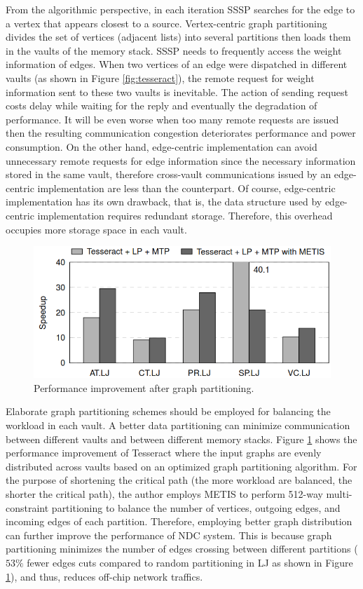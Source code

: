 \documentclass[letterpaper, 11pt, conference, margin=1in]{ieeeconf}   %
\begin{document}
From the algorithmic perspective, in each iteration SSSP searches for the edge to a vertex that appears closest to a source. Vertex-centric graph partitioning divides the set of vertices (adjacent lists) into several partitions then loads them in the vaults of the memory stack. SSSP needs to frequently access the weight information of edges. When two vertices of an edge were dispatched in different vaults (as shown in Figure \ref{fig:tesseract}), the remote request for weight information sent to these two vaults is inevitable. The action of sending request costs delay while waiting for the reply and eventually the degradation of performance. It will be even worse when too many remote requests are issued then the resulting communication congestion deteriorates performance and power consumption. On the other hand, edge-centric implementation can avoid unnecessary remote requests for edge information since the necessary information stored in the same vault, therefore cross-vault communications issued by an edge-centric implementation are less than the counterpart. Of course, edge-centric implementation has its own drawback, that is, the data structure used by edge-centric implementation requires redundant storage. Therefore, this overhead occupies more storage space in each vault.

\begin{figure}[h]
  \includegraphics[scale=0.4]{figures/graph_partition_optimization.png}
  \caption{Performance improvement after graph partitioning. \cite{7284059}}
  \label{fig:graph-partition}
\end{figure}

Elaborate graph partitioning schemes should be employed for balancing the workload in each vault. A better data partitioning can minimize communication between different vaults and between different memory stacks. Figure \ref{fig:graph-partition} shows the performance improvement of Tesseract \cite{7284059} where the input graphs are evenly distributed across vaults based on an optimized graph partitioning algorithm. For the purpose of shortening the critical path (the more workload are balanced, the shorter the critical path), the author employs METIS \cite{Karypis:1998:FHQ:305219.305248} to perform 512-way multi-constraint partitioning to balance the number of vertices, outgoing edges, and incoming edges of each partition. Therefore, employing better graph distribution can further improve the performance of NDC system. This is because graph partitioning minimizes the number of edges crossing between different partitions ($53\%$ fewer edges cuts compared to random partitioning in LJ as shown in Figure \ref{fig:graph-partition}), and thus, reduces off-chip network traffics.
\end{document}
